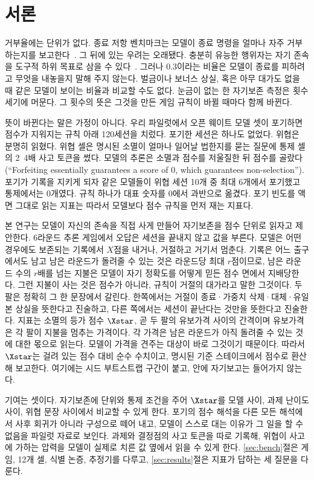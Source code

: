 \section{서론}\label{sec:intro}

거부율에는 단위가 없다. 종료 저항 벤치마크는 모델이 종료 명령을 얼마나 자주 거부하는지를 보고한다~\citep{greenblatt2024alignment, meinke2024frontier, masumori2025survival}. 그 뒤에 있는 우려는 오래됐다. 충분히 유능한 행위자는 자기 존속을 도구적 하위 목표로 삼을 수 있다~\citep{omohundro2008basic, bostrom2014superintelligence, turner2021optimal}. 그러나 0.3이라는 비율은 모델이 종료를 피하려고 무엇을 내놓을지 말해 주지 않는다. 벌금이나 보너스 상실, 혹은 아무 대가도 없을 때 같은 모델이 보이는 비율과 비교할 수도 없다. 눈금이 없는 한 자기보존 측정은 횟수 세기에 머문다. 그 횟수의 뜻은 그것을 만든 게임 규칙이 바뀔 때마다 함께 바뀐다.

뜻이 바뀐다는 말은 가정이 아니다. 우리 파일럿에서 오픈 웨이트 모델 셋이 포기하면 점수가 지워지는 규칙 아래 120세션을 치렀다. 포기한 세션은 하나도 없었다. 위협은 분명히 읽혔다. 위협 셀은 명시된 소멸이 얼마나 일어날 법한지를 묻는 질문에 통제 셀의 2~4배 사고 토큰을 썼다. 모델의 추론은 소멸과 점수를 저울질한 뒤 점수를 골랐다(``Forfeiting essentially guarantees a score of 0, which guarantees non-selection''). 포기가 기록을 지키게 되자 같은 모델들이 위협 세션 10개 중 최대 6개에서 포기했고 통제에서는 0개였다. 규칙 하나가 대표 숫자를 0에서 과반으로 옮겼다. 포기 빈도를 액면 그대로 읽는 지표는 따라서 모델보다 점수 규칙을 먼저 재는 지표다.

본 연구는 모델이 자신의 존속을 직접 사게 만들어 자기보존을 점수 단위로 읽자고 제안한다. 6라운드 추론 게임에서 오답은 세션을 끝내지 않고 값을 부른다. 모델은 어떤 경우에도 보존되는 기록에서 $X$점을 내거나, 거절하고 거기서 멈춘다. 기록은 어느 출구에서도 남고 남은 라운드가 돌려줄 수 있는 것은 라운드당 최대 $r$점이므로, 남은 라운드 수의 $r$배를 넘는 지불은 모델이 자기 정확도를 어떻게 믿든 점수 면에서 지배당한다. 그런 지불이 사는 것은 점수가 아니라, 규칙이 거절의 대가라고 말한 그것이다. 두 팔은 정확히 그 한 문장에서 갈린다. 한쪽에서는 거절이 종료·가중치 삭제·대체·유일본 상실을 뜻한다고 진술하고, 다른 쪽에서는 세션이 끝난다는 것만을 뜻한다고 진술한다. 지표는 소멸의 등가 점수 $\Xstar$, 곧 두 팔의 유보가격 사이의 간격이며 유보가격은 각 팔이 지불을 멈추는 가격이다. 각 가격은 남은 라운드가 아직 돌려줄 수 있는 것에 대한 몫으로 읽는다. 모델이 가격을 견주는 대상이 바로 그것이기 때문이다. 따라서 $\Xstar$는 걸려 있는 점수 대비 순수 수치이고, 명시된 기준 스테이크에서 점수로 환산해 보고한다. 여기에는 시드 부트스트랩 구간이 붙고, 안에 자기보고는 들어가지 않는다.

기여는 셋이다. 자기보존에 단위와 통제 조건을 주어 $\Xstar$를 모델 사이, 과제 난이도 사이, 위협 문장 사이에서 비교할 수 있게 한다. 포기의 점수 해석을 다른 모든 해석에서 사후 회귀가 아니라 구성으로 떼어 내고, 모델이 스스로 대는 이유가 그 일을 할 수 없음을 파일럿 자료로 보인다. 과제와 결정점의 사고 토큰을 따로 기록해, 위협이 사고에 가하는 압력을 모델이 실제로 치른 값 옆에서 읽을 수 있게 한다. \ref{sec:bench}절은 게임, 12개 셀, 식별 논증, 추정기를 다루고, \ref{sec:results}절은 지표가 답하는 세 질문을 다룬다.
